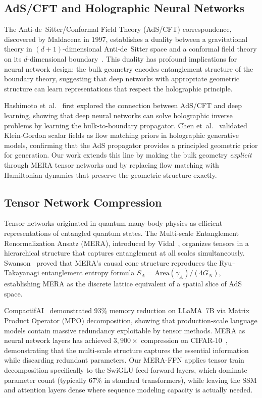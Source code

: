 \documentclass[11pt,a4paper,twocolumn]{article}
\begin{document}
\subsection{AdS/CFT and Holographic Neural Networks}

The Anti-de~Sitter/Conformal Field Theory (AdS/CFT) correspondence, discovered by Maldacena in 1997, establishes a duality between a gravitational theory in $(d+1)$-dimensional Anti-de~Sitter space and a conformal field theory on its $d$-dimensional boundary~\cite{hashimoto2018}.
This duality has profound implications for neural network design: the bulk geometry encodes entanglement structure of the boundary theory, suggesting that deep networks with appropriate geometric structure can learn representations that respect the holographic principle.

Hashimoto et~al.~\cite{hashimoto2018} first explored the connection between AdS/CFT and deep learning, showing that deep neural networks can solve holographic inverse problems by learning the bulk-to-boundary propagator.
Chen et~al.~\cite{chen2026holographic} validated Klein-Gordon scalar fields as flow matching priors in holographic generative models, confirming that the AdS propagator provides a principled geometric prior for generation.
Our work extends this line by making the bulk geometry \emph{explicit} through MERA tensor networks and by replacing flow matching with Hamiltonian dynamics that preserve the geometric structure exactly.

\subsection{Tensor Network Compression}

Tensor networks originated in quantum many-body physics as efficient representations of entangled quantum states.
The Multi-scale Entanglement Renormalization Ansatz (MERA), introduced by Vidal~\cite{vidal2007}, organizes tensors in a hierarchical structure that captures entanglement at all scales simultaneously.
Swanson~\cite{swanson2014} proved that MERA's causal cone structure reproduces the Ryu--Takayanagi entanglement entropy formula $S_A = \mathrm{Area}(\gamma_A)/(4G_N)$, establishing MERA as the discrete lattice equivalent of a spatial slice of AdS space.

CompactifAI~\cite{compactifai2024} demonstrated 93\% memory reduction on LLaMA~7B via Matrix Product Operator (MPO) decomposition, showing that production-scale language models contain massive redundancy exploitable by tensor methods.
MERA as neural network layers has achieved $3{,}900\times$ compression on CIFAR-10~\cite{mera_compact}, demonstrating that the multi-scale structure captures the essential information while discarding redundant parameters.
Our MERA-FFN applies tensor train decomposition specifically to the SwiGLU feed-forward layers, which dominate parameter count (typically 67\% in standard transformers), while leaving the SSM and attention layers dense where sequence modeling capacity is actually needed.
\end{document}
